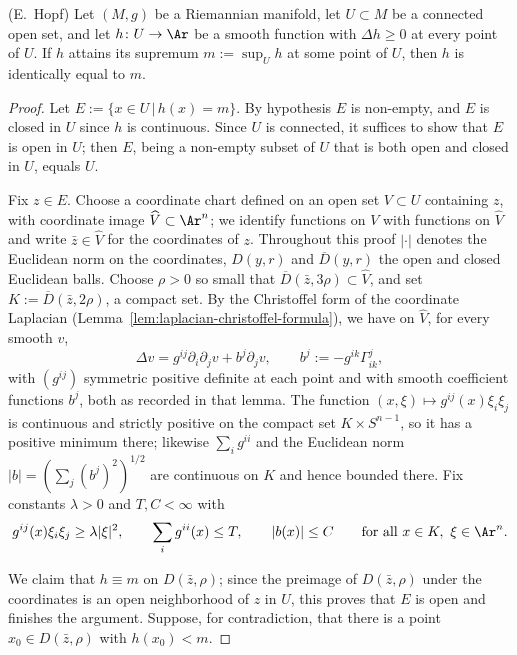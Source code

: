 \begin{lemma}
\label{lem:hopf-strong-maximum}
\leanok
(E.~Hopf) Let $(M,g)$ be a Riemannian manifold, let $U\subset M$ be
a connected open set, and let $h\colon U\to\Ar$ be a smooth
function with $\Delta h\ge 0$ at every point of $U$. If $h$ attains
its supremum $m:=\sup_Uh$ at some point of $U$, then $h$ is
identically equal to $m$.
\end{lemma}

\begin{proof}
\leanok
Let $E:=\{x\in U\,|\,h(x)=m\}$. By hypothesis $E$ is non-empty, and
$E$ is closed in $U$ since $h$ is continuous. Since $U$ is
connected, it suffices to show that $E$ is open in $U$; then $E$,
being a non-empty subset of $U$ that is both open and closed in
$U$, equals $U$.

Fix $z\in E$. Choose a coordinate chart defined on an open set
$V\subset U$ containing $z$, with coordinate image
$\widehat{V}\subset\Ar^n$; we identify functions on $V$ with
functions on $\widehat{V}$ and write $\bar z\in\widehat{V}$ for the
coordinates of $z$. Throughout this proof $|\cdot|$ denotes the
Euclidean norm on the coordinates, $D(y,r)$ and $\overline{D}(y,r)$
the open and closed Euclidean balls. Choose $\rho>0$ so small that
$\overline{D}(\bar z,3\rho)\subset\widehat{V}$, and set
$K:=\overline{D}(\bar z,2\rho)$, a compact set. By the Christoffel
form of the coordinate Laplacian
(Lemma~\ref{lem:laplacian-christoffel-formula}), we have on
$\widehat{V}$, for every smooth $v$,
$$\Delta v=g^{ij}\partial_i\partial_jv+b^j\partial_jv,
\qquad b^j:=-g^{ik}\Gamma^j_{ik},$$
with $(g^{ij})$ symmetric positive definite at each point and with
smooth coefficient functions $b^j$, both as recorded in that lemma.
The function $(x,\xi)\mapsto g^{ij}(x)\xi_i\xi_j$ is continuous and
strictly positive on the compact set $K\times S^{n-1}$, so it has a
positive minimum there; likewise $\sum_ig^{ii}$ and the Euclidean
norm $|b|=\left(\sum_j(b^j)^2\right)^{1/2}$ are continuous on $K$
and hence bounded there. Fix constants $\lambda>0$ and
$T,C<\infty$ with
$$g^{ij}(x)\xi_i\xi_j\ge\lambda|\xi|^2,\qquad
\sum_ig^{ii}(x)\le T,\qquad |b(x)|\le C \qquad\text{for all } x\in
K,\ \xi\in\Ar^n.$$

We claim that $h\equiv m$ on $D(\bar z,\rho)$; since the preimage
of $D(\bar z,\rho)$ under the coordinates is an open neighborhood
of $z$ in $U$, this proves that $E$ is open and finishes the
argument. Suppose, for contradiction, that there is a point
$x_0\in D(\bar z,\rho)$ with $h(x_0)<m$.


\end{proof}
